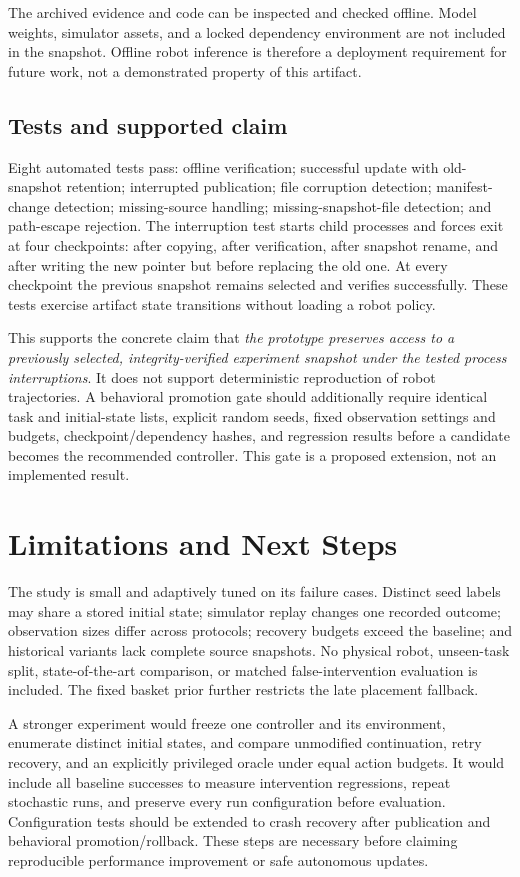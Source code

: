 \documentclass[10pt,twocolumn]{article}
\begin{document}
The archived evidence and code can be inspected and checked offline. Model weights, simulator assets, and a locked dependency environment are not included in the snapshot. Offline robot inference is therefore a deployment requirement for future work, not a demonstrated property of this artifact.

\subsection{Tests and supported claim}
Eight automated tests pass: offline verification; successful update with old-snapshot retention; interrupted publication; file corruption detection; manifest-change detection; missing-source handling; missing-snapshot-file detection; and path-escape rejection. The interruption test starts child processes and forces exit at four checkpoints: after copying, after verification, after snapshot rename, and after writing the new pointer but before replacing the old one. At every checkpoint the previous snapshot remains selected and verifies successfully. These tests exercise artifact state transitions without loading a robot policy.

This supports the concrete claim that \emph{the prototype preserves access to a previously selected, integrity-verified experiment snapshot under the tested process interruptions}. It does not support deterministic reproduction of robot trajectories. A behavioral promotion gate should additionally require identical task and initial-state lists, explicit random seeds, fixed observation settings and budgets, checkpoint/dependency hashes, and regression results before a candidate becomes the recommended controller. This gate is a proposed extension, not an implemented result.

\section{Limitations and Next Steps}
The study is small and adaptively tuned on its failure cases. Distinct seed labels may share a stored initial state; simulator replay changes one recorded outcome; observation sizes differ across protocols; recovery budgets exceed the baseline; and historical variants lack complete source snapshots. No physical robot, unseen-task split, state-of-the-art comparison, or matched false-intervention evaluation is included. The fixed basket prior further restricts the late placement fallback.

A stronger experiment would freeze one controller and its environment, enumerate distinct initial states, and compare unmodified continuation, retry recovery, and an explicitly privileged oracle under equal action budgets. It would include all baseline successes to measure intervention regressions, repeat stochastic runs, and preserve every run configuration before evaluation. Configuration tests should be extended to crash recovery after publication and behavioral promotion/rollback. These steps are necessary before claiming reproducible performance improvement or safe autonomous updates.
\end{document}
